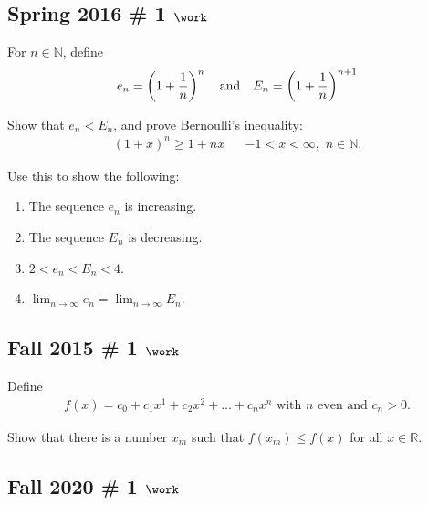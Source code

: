 \begin{solution}
\end{solution}

\hypertarget{spring-2016-1-work}{%
\subsection{\texorpdfstring{Spring 2016 \# 1
\(\work\)}{Spring 2016 \# 1 \textbackslash work}}\label{spring-2016-1-work}}

For \(n\in {\mathbb{N}}\), define
\begin{align*}
e_{n} = \left (1+ {1\over n} \right)^{n} 
{\quad \operatorname{and} \quad}
E_{n} = \left( 1+ {1\over n} \right)^{n+1}
\end{align*}

Show that \(e_n < E_n\), and prove Bernoulli's inequality:
\begin{align*}
(1+x)^n \geq 1+nx && -1 < x < \infty  ,\,\, n\in {\mathbb{N}}
.\end{align*}

Use this to show the following:

\begin{enumerate}
\def\labelenumi{\arabic{enumi}.}
\tightlist
\item
  The sequence \(e_n\) is increasing.
\item
  The sequence \(E_n\) is decreasing.
\item
  \(2 < e_n < E_n < 4\).
\item
  \(\lim _{n \to \infty} e_{n} = \lim _{n \to \infty} E_{n}\).
\end{enumerate}

\hypertarget{fall-2015-1-work}{%
\subsection{\texorpdfstring{Fall 2015 \# 1
\(\work\)}{Fall 2015 \# 1 \textbackslash work}}\label{fall-2015-1-work}}

Define
\begin{align*}
f(x)=c_{0}+c_{1} x^{1}+c_{2} x^{2}+\ldots+c_{n} x^{n} \text { with } n \text { even and } c_{n}>0.
\end{align*}

Show that there is a number \(x_m\) such that \(f(x_m) \leq f(x)\) for
all \(x\in {\mathbb{R}}\).

\hypertarget{fall-2020-1-work}{%
\subsection{\texorpdfstring{Fall 2020 \# 1
\(\work\)}{Fall 2020 \# 1 \textbackslash work}}\label{fall-2020-1-work}}

